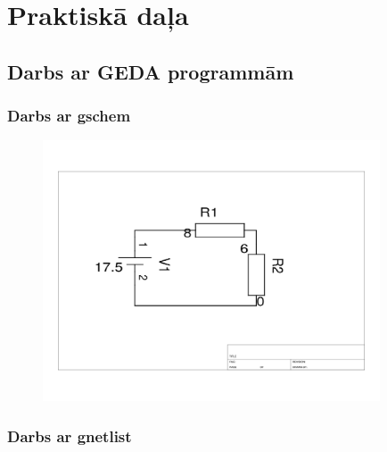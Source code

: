 \documentclass{report}
\begin{document}
\chapter{Praktiskā daļa}
\section{Darbs ar GEDA programmām}
\subsection{Darbs ar gschem}
\begin{figure}[h]
    \centering
    \includegraphics[width=10cm]{shema.png}
    \caption{}
    \label{fig:sh2}
\end{figure}

\newpage
\subsection{Darbs ar gnetlist}

\end{document}
